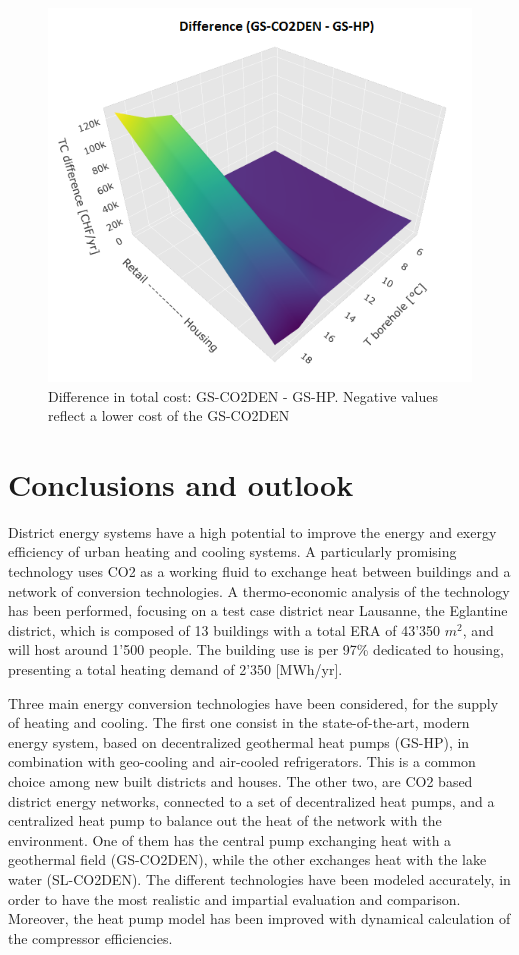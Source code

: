 \documentclass{article}
\begin{document}
\begin{figure}[tph]
	\centering
	\includegraphics[width=0.75\linewidth]{Images/CUTg_SA_TC_diff}
	\caption{Difference in total cost: GS-CO2DEN - GS-HP. Negative values reflect a lower cost of the GS-CO2DEN}
	\label{fig:cutgsadiff_TC}
\end{figure}

\clearpage
\newpage
\section{Conclusions and outlook}
District energy systems have a high potential to improve the energy and exergy efficiency of urban heating and cooling systems. A particularly promising technology uses CO2 as a working fluid to exchange heat between buildings and a network of conversion technologies. A thermo-economic analysis of the technology has been performed, focusing on a test case district near Lausanne, the Eglantine district, which is composed of 13 buildings with a total ERA of  43'350 $m^2$, and will host around 1'500 people. The building use is per 97\% dedicated to housing, presenting a total heating demand of 2'350 [MWh/yr].

Three main energy conversion technologies have been considered, for the supply of heating and cooling. The first one consist in the state-of-the-art, modern energy system, based on decentralized geothermal heat pumps (GS-HP), in combination with geo-cooling and air-cooled refrigerators. This is a common choice among new built districts and houses. The other two, are CO2 based district energy networks, connected to a set of decentralized heat pumps, and a centralized heat pump to balance out the heat of the network with the environment. One of them has the central pump exchanging heat with a geothermal field (GS-CO2DEN), while the other exchanges heat with the lake water (SL-CO2DEN). The different technologies have been modeled accurately, in order to have the most realistic and impartial evaluation and comparison. Moreover, the heat pump model has been improved with dynamical calculation of the compressor efficiencies.\\
\end{document}
